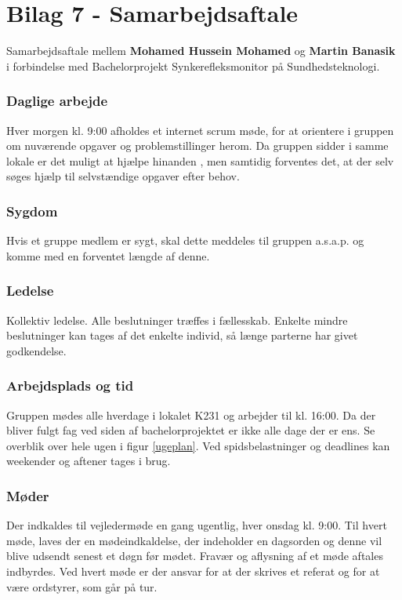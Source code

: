 

\chapter*{Bilag 7 - Samarbejdsaftale}


Samarbejdsaftale mellem \textbf{Mohamed Hussein Mohamed} og\textbf{ Martin Banasik} i forbindelse med Bachelorprojekt Synkerefleksmonitor på Sundhedsteknologi. 

\subsection*{Daglige arbejde}
Hver morgen kl. 9:00 afholdes et internet scrum møde, for at orientere i gruppen om nuværende opgaver og problemstillinger herom. 
Da gruppen sidder i samme lokale er det muligt at hjælpe hinanden , men samtidig forventes det, at der selv søges hjælp til selvstændige opgaver efter behov. 

\subsection*{Sygdom}
Hvis et gruppe medlem er sygt, skal dette meddeles til gruppen a.s.a.p. og komme med en forventet længde af denne.

\subsection*{Ledelse}
Kollektiv ledelse. 
Alle beslutninger træffes i fællesskab. 
Enkelte mindre beslutninger kan tages af det enkelte individ, så længe parterne har givet godkendelse. 

\subsection*{Arbejdsplads og tid}
Gruppen mødes alle hverdage i lokalet K231 og arbejder til kl. 16:00. Da der bliver fulgt fag ved siden af bachelorprojektet er ikke alle dage der er ens. Se overblik over hele ugen i figur \ref{ugeplan}. Ved spidsbelastninger og deadlines kan weekender og aftener tages i brug.

\subsection*{Møder}
Der indkaldes til vejledermøde en gang ugentlig, hver onsdag kl. 9:00. 
Til hvert møde, laves der en mødeindkaldelse, der indeholder en dagsorden og denne vil blive udsendt senest et døgn før mødet.
Fravær og aflysning af et møde aftales indbyrdes. 
Ved hvert møde er der ansvar for at der skrives et referat og for at være ordstyrer, som går på tur.

